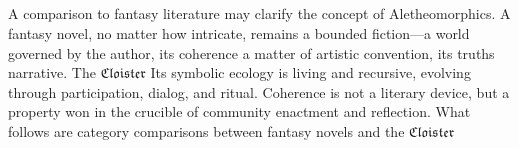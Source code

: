 \subsection*{}

A comparison to fantasy literature may clarify the concept of Aletheomorphics.
A fantasy novel, no matter how intricate, remains a bounded fiction—a world
governed by the author, its coherence a matter of artistic convention, its
truths narrative. The $\mathfrak{Cloister}$ Its symbolic ecology is living and
recursive, evolving through participation, dialog, and ritual. Coherence is not
a literary device, but a property won in the crucible of community enactment
and reflection.  What follows are category comparisons between fantasy novels
and the $\mathfrak{Cloister}$

